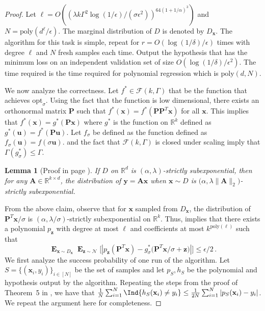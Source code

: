 \documentclass[10pt,a4paper]{article}
\newtheorem{lemma}{Lemma}[section]
\newcommand\twonorm[1]{\|#1\|_2}
\renewcommand\vec[1]{\mathbf{#1}}
\DeclareMathOperator*{\E}{\mathbf{E}}
\newcommand{\R}{\mathbb{R}}
\newcommand{\poly}{\mathrm{poly}}
\newcommand{\D}{D}
\newcommand{\1}{\Ind}
\newcommand{\smoothopt}{\mathrm{opt}_{\sigma}}
\newcommand{\x}{\vec x}
\newcommand{\vu}{\vec u}
\newcommand{\z}{\vec z}
\newcommand{\F}{\mathcal{F}}
\newcommand{\Gauss}{\mathcal{N}}
\newcommand{\Dmarginal}{D_{\x}}
\begin{document}
\begin{proof}

Let $\ell=O\left({\left(\lambda k\Gamma^2\log (1/\epsilon)/(\sigma\epsilon^2)\right)^{64(1+1/\alpha)^3}}\right)$ and $N=\poly(d^{\ell}/\epsilon)$. The marginal distribution of $D$ is denoted by $\D_{\x}$. The algorithm for this task is simple, repeat  for $r=O(\log(1/\delta)/\epsilon)$ times with degree $\ell$ and $N$ fresh samples each time. Output the hypothesis that has the minimum loss on an independent validation set of size $O(\log(1/\delta)/\epsilon^2)$. The time required is the time required for polynomial regression which is $\poly(d,N)$. 

We now analyze the correctness. Let $f^*\in \F(k,\Gamma)$ that be the function that achieves $\smoothopt$. Using the fact that the function is low dimensional, there exists an orthonormal matrix $\vec P$ such that $f^*(\x)=f^*(\vec P \vec P^T \x)$ for all $\x$. This implies that $f^*(\x)=g^*(\vec P \x)$ where $g^*$ is the function on $\R^{k}$ defined as $g^*(\vec u)=f^*(\vec P \vec u)$. Let $f_\sigma$ be defined as the function defined as $f_{\sigma}(\vu)=f(\sigma \vu)$.  and the fact that $\F(k,\Gamma)$ is closed under scaling imply that $\Gamma(g^*_\sigma)\leq \Gamma$. 
\begin{lemma}[Proof in page  \pageref{proof:subexp_scaling}]
\label{lem:subexp_scaling}
    If $D$ on $\R^d$ is $(\alpha,\lambda)$-strictly subexponential, then for any $\vec A\in \R^{k\times d}$, the distribution of $\vec y=\vec A\x$ when $\x\sim D$ is $\bigl(\alpha,\lambda\twonorm{\vec A}\bigr)$-strictly subexponential.
\end{lemma}
From the above claim, observe that for $\x$ sampled from $\D_{\x}$, the distribution of $\vec P^T \x/\sigma$ is $(\alpha,\lambda/\sigma)$-strictly subexponential on $\R^k$. Thus,  implies that there exists a polynomial $p_{\z}$ with degree at most  $\ell$ and coefficients at most $k^{\poly(\ell)}$ such that 
    \[
        \E_{\x\sim \Dmarginal}\E_{\z\sim \Gauss}\bigl[|p_\z(\vec P^T \x)-g^*_{\sigma}\bigl(\vec P^T\x/\sigma+ \z\bigr)|\bigr]\leq \epsilon/2\,.
        \]
    We first analyze the success probability of one run of the algorithm. Let $S=\{(\x_i,y_i)\}_{i\in [N]}$ be the set of samples and let $p_S, h_S$ be the polynomial and hypothesis output by the algorithm. Repeating the steps from the proof of Theorem~5 in \cite{KKMS:05}, we have that $\frac{1}{N}\sum_{i=1}^{N} \1\{h_S(\x_i)\neq y_i\}\leq \frac{1}{2N}\sum_{i=1}^{N}|p_S(\x_i)-y_i|$. We repeat the argument here for completeness. 

\end{proof}
\end{document}
